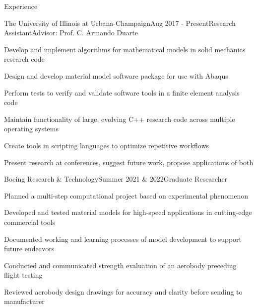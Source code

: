 \documentclass{resume} %
\begin{document}

\begin{rSection}{Experience}

\begin{rSubsection}{The University of Illinois at Urbana-Champaign}{Aug 2017 - Present}{Research Assistant}{Advisor: Prof. C. Armando Duarte}
\item Develop and implement algorithms for mathematical models in solid mechanics research code
\item Design and develop material model software package for use with Abaqus
\item Perform tests to verify and validate software tools in a finite element analysis code
\item Maintain functionality of large, evolving C++ research code across multiple operating systems
\item Create tools in scripting languages to optimize repetitive workflows
\item Present research at conferences, suggest future work, propose applications of both
\end{rSubsection}


\begin{rSubsection}{Boeing Research \& Technology}{Summer 2021  \& 2022}{Graduate Researcher}{}
%
\item Planned a multi-step computational project based on experimental phenomenon
\item Developed and tested material models for high-speed applications in cutting-edge commercial tools
\item Documented working and learning processes of model development to support future endeavors
\item Conducted and communicated strength evaluation of an aerobody preceding flight testing
\item Reviewed aerobody design drawings for accuracy and clarity before sending to manufacturer
\end{rSubsection}


\end{rSection}
\end{document}
